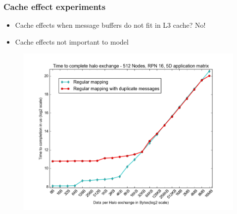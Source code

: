 \documentclass{beamer}
\begin{document}
\begin{frame}
\frametitle{Cache effect experiments}
\begin{itemize}
    \item Cache effects when message buffers do not fit in L3 cache? No!
    \item Cache effects not important to model
\end{itemize}
\begin{figure}
\includegraphics[width=0.8\linewidth]{../cache_duplicates_vs_regular.png}
\end{figure}
\end{frame}
\end{document}
